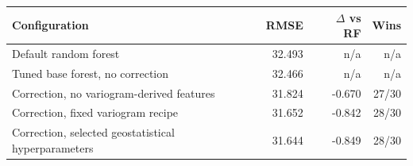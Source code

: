 \begin{tabular}{lrrr}
\toprule
Configuration & RMSE & $\Delta$ vs RF & Wins \\
\midrule
Default random forest & 32.493 & n/a & n/a \\
Tuned base forest, no correction & 32.466 & n/a & n/a \\
Correction, no variogram-derived features & 31.824 & -0.670 & 27/30 \\
Correction, fixed variogram recipe & 31.652 & -0.842 & 28/30 \\
Correction, selected geostatistical hyperparameters & 31.644 & -0.849 & 28/30 \\
\bottomrule
\end{tabular}
